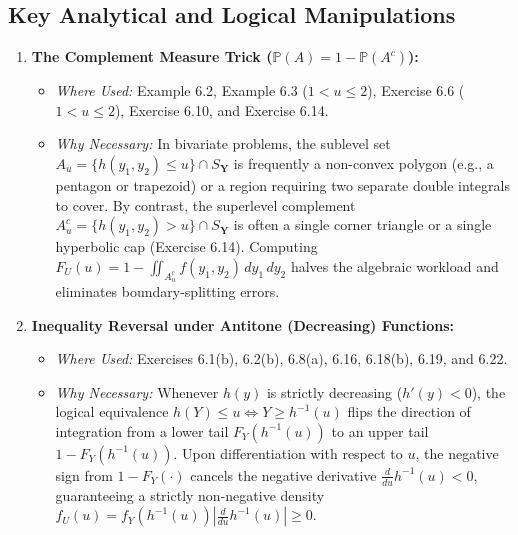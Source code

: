 \documentclass[11pt, letterpaper]{article}
\theoremstyle{definition}
\theoremstyle{remark}
\newcommand{\Prob}{\mathbb{P}}
\begin{document}
\subsection{Key Analytical and Logical Manipulations}

\begin{enumerate}
    \item \textbf{The Complement Measure Trick ($\Prob(A) = 1 - \Prob(A^c)$):}
    \begin{itemize}
        \item \textit{Where Used:} Example 6.2, Example 6.3 ($1 < u \le 2$), Exercise 6.6 ($1 < u \le 2$), Exercise 6.10, and Exercise 6.14.
        \item \textit{Why Necessary:} In bivariate problems, the sublevel set $A_u = \{h(y_1, y_2) \le u\} \cap S_{\mathbf{Y}}$ is frequently a non-convex polygon (e.g., a pentagon or trapezoid) or a region requiring two separate double integrals to cover. By contrast, the superlevel complement $A_u^c = \{h(y_1, y_2) > u\} \cap S_{\mathbf{Y}}$ is often a single corner triangle or a single hyperbolic cap (Exercise 6.14). Computing $F_U(u) = 1 - \iint_{A_u^c} f(y_1, y_2)\,dy_1\,dy_2$ halves the algebraic workload and eliminates boundary-splitting errors.
    \end{itemize}

    \item \textbf{Inequality Reversal under Antitone (Decreasing) Functions:}
    \begin{itemize}
        \item \textit{Where Used:} Exercises 6.1(b), 6.2(b), 6.8(a), 6.16, 6.18(b), 6.19, and 6.22.
        \item \textit{Why Necessary:} Whenever $h(y)$ is strictly decreasing ($h'(y) < 0$), the logical equivalence $h(Y) \le u \iff Y \ge h^{-1}(u)$ flips the direction of integration from a lower tail $F_Y(h^{-1}(u))$ to an upper tail $1 - F_Y(h^{-1}(u))$. Upon differentiation with respect to $u$, the negative sign from $1 - F_Y(\cdot)$ cancels the negative derivative $\frac{d}{du}h^{-1}(u) < 0$, guaranteeing a strictly non-negative density $f_U(u) = f_Y(h^{-1}(u)) \left|\frac{d}{du}h^{-1}(u)\right| \ge 0$.
    \end{itemize}


\end{enumerate}
\end{document}
